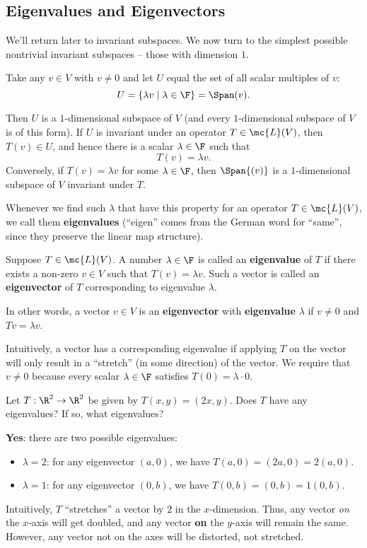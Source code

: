 \documentclass[math0540-lecture-notes.tex]{subfiles}
\begin{document}
\subsection{Eigenvalues and Eigenvectors}

We'll return later to invariant subspaces. We now turn to the simplest possible nontrivial invariant
subspaces -- those with dimension $1$.

Take any $v\in V$ with $v\neq 0$ and let $U$ equal the set of all scalar multiples of $v$: \[
  U = \{\lambda v\mid \lambda\in \F\} =\Span(v)
.\] 

Then $U$ is a $1$-dimensional subspace of $V$ (and every $1$-dimensional subspace of $V$ is of this
form). If $U$ is invariant under an operator $T\in \mc{L}(V)$, then $T(v)\in U$, and hence there is
a scalar $\lambda\in \F$ such that \[
  T(v)=\lambda v
.\] Conversely, if $T(v)=\lambda v$ for some $\lambda\in \F$, then $\Span{(v)}$ is a $1$-dimensional
subspace of $V$ invariant under $T$.

Whenever we find such $\lambda$ that have this property for an operator $T\in \mc{L}(V)$, we call
them \textbf{eigenvalues} (``eigen'' comes from the German word for ``same'', since they preserve
the linear map structure).

\begin{definition}{}
  Suppose $T\in \mc{L}(V)$. A number $\lambda\in \F$ is called an \textbf{eigenvalue} of $T$ if
  there exists a non-zero $v\in V$ such that $T(v)=\lambda v$. Such a vector is called an
  \textbf{eigenvector} of $T$ corresponding to eigenvalue $\lambda$.

  In other words, a vector $v\in V$ is an \textbf{eigenvector} with \textbf{eigenvalue} $\lambda$ if
  $v\neq 0$ and $Tv=\lambda v$.
\end{definition}

Intuitively, a vector has a corresponding eigenvalue if applying $T$ on the vector will only result
in a ``stretch'' (in some direction) of the vector. We require that $v\neq 0$ because every scalar
$\lambda\in \F$ satisfies $T(0)=\lambda\cdot 0$.

\begin{example}
  Let $T:\R^2\to \R^2$ be given by $T(x,y)=(2x,y)$. Does $T$ have any eigenvalues? If so, what
  eigenvalues?

  \textbf{Yes}: there are two possible eigenvalues:
  \begin{itemize}
    \item $\lambda=2$: for any eigenvector $(a,0)$, we have $T(a,0)=(2a,0)=2(a,0)$.
    \item $\lambda=1$: for any eigenvector $(0,b)$, we have $T(0,b)=(0,b)=1(0,b)$.
  \end{itemize}

  Intuitively, $T$ ``stretches'' a vector by $2$ in the $x$-dimension. Thus, any vector \textit{on}
  the $x$-axis will get doubled, and any vector \textbf{on} the $y$-axis will remain the same.
  However, any vector not on the axes will be distorted, not stretched.
\end{example}
\end{document}
